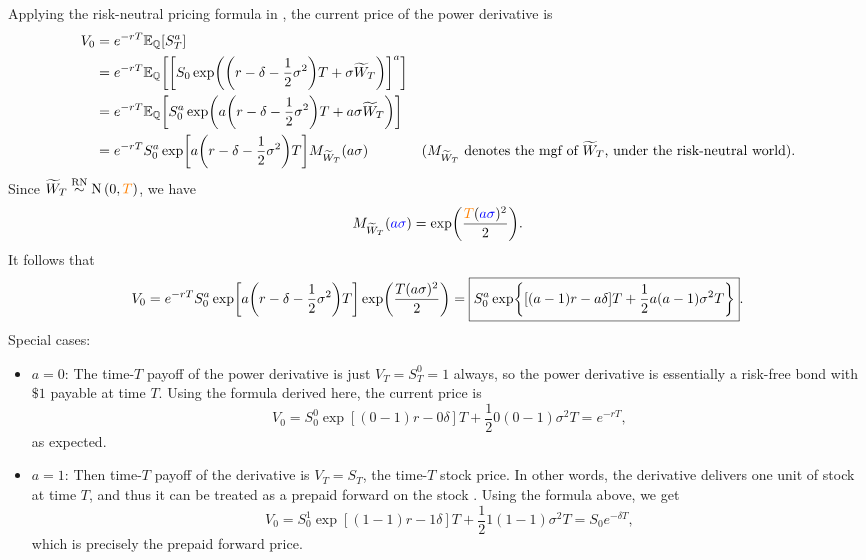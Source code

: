 \begin{enumerate}
Applying the risk-neutral pricing formula in ,
the current price of the power derivative is
\begin{align*}
V_0&=e^{-rT}\mathbb{E}_{\mathbb{Q}}\qty[S_T^{a}] \\
&=e^{-rT}\mathbb{E}_{\mathbb{Q}}\qty[\qty[S_0\exp(\qty(r-\delta-\frac{1}{2}\sigma^2)T+\sigma\widetilde{W}_T)]^{a}] \\
&=e^{-rT}\mathbb{E}_{\mathbb{Q}}\qty[S_0^{a}\exp(a\qty(r-\delta-\frac{1}{2}\sigma^2)T+a\sigma\widetilde{W}_T)] \\
&=e^{-rT}S_0^{a}\exp[a\qty(r-\delta-\frac{1}{2}\sigma^2)T]M_{\widetilde{W}_T}(a\sigma)&\text{(\(M_{\widetilde{W}_T}\)
denotes the mgf of \(\widetilde{W}_T\), under the risk-neutral world)}.
\end{align*}
Since \(\widetilde{W}_T\overset{\mathrm{RN}}{\sim}\operatorname{N}\qty(0,{\color{orange}T})\), we have
\[
M_{\widetilde{W}_T}({\color{blue}a\sigma})
=\exp(\frac{{\color{orange}T}({\color{blue}a\sigma})^{2}}{2}).
\]
It follows that
\[
V_0=e^{-rT}S_0^{a}\exp[a\qty(r-\delta-\frac{1}{2}\sigma^2)T]\exp(\frac{T(a\sigma)^{2}}{2})
=\boxed{S_0^{a}\exp{[(a-1)r-a\delta]T+\frac{1}{2}a(a-1)\sigma^2T}}.
\]
Special cases:
\begin{itemize}
\item \(a=0\): The time-\(T\) payoff of the power derivative is just
\(V_T=S_T^{0}=1\) always, so the power derivative is essentially a risk-free
bond with\(\$1\) payable at time \(T\). Using the formula derived here, the
current price is
\[
V_0=S_0^{0}\exp{[(0-1)r-0\delta]T+\frac{1}{2}0(0-1)\sigma^2T}
=e^{-rT},
\]
as expected.
\item \(a=1\): Then time-\(T\) payoff of the derivative is \(V_T=S_T\), the
time-\(T\) stock price. In other words, the derivative delivers one unit of
stock  at time \(T\), and thus it can be treated as a prepaid
forward on the stock . Using the formula above, we get
\[
V_0=S_0^{1}\exp{[(1-1)r-1\delta]T+\frac{1}{2}1(1-1)\sigma^2T}
=S_0e^{-\delta T},
\]
which is precisely the prepaid forward price.
\end{itemize}
\end{enumerate}
